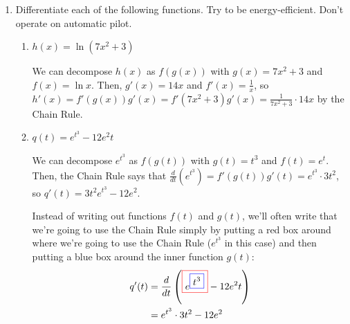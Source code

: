 \documentclass{article}
\begin{document}
\begin{enumerate}
\item 

  Differentiate each of the following functions. Try to be energy-efficient.
  Don't operate on automatic pilot.
  \begin{enumerate}

  \item
    \begin{problem}[\vfill]
      $h(x) = \ln (7x^2 + 3)$
    \end{problem}

    \begin{solution}
      We can decompose $h(x)$ as $f(g(x))$ with $g(x) = 7x^2 + 3$ and
      $f(x) = \ln x$.  Then, $g'(x) = 14 x$ and $f'(x) = \frac{1}{x}$, so
      $h'(x) = f'(g(x)) g'(x) = f'(7x^2 + 3) g'(x) = \boxed{\frac{1}{7x^2
          + 3} \cdot 14x}$ by the Chain Rule. 
    \end{solution}

  \item
    \begin{problem}[\vfill]
      $q(t) = e^{t^3} - 12 e^2 t$
    \end{problem}

    \begin{solution}
      We can decompose $e^{t^3}$ as $f(g(t))$ with $g(t) = t^3$ and $f(t)
      = e^t$.  Then, the Chain Rule says that $\frac{d}{dt} \left(e^{t^3}
      \right) = f'(g(t)) g'(t) = e^{t^3} \cdot 3t^2$, so $q'(t) =
      \boxed{3t^2 e^{t^3} - 12 e^2}$.

      Instead of writing out functions $f(t)$ and $g(t)$, we'll often
      write that we're going to use the Chain Rule simply by putting a red
      box around where we're going to use the Chain Rule ($e^{t^3}$ in
      this case) and then putting a blue box around the inner function
      $g(t)$: 
      \begin{align*}
        q'(t) &= \frac{d}{dt} \left(\fcolorbox{red}{white}{$\displaystyle
            e^ { \fcolorbox{blue}{white}{$\displaystyle t^ { 3} $}}
            $} - 12 e^2 t \right) \\ 
        &= e^ { t^ { 3} } \cdot 3 t^ { 2} -12 e^2
      \end{align*}
    \end{solution}


\end{enumerate}
\end{enumerate}
\end{document}
